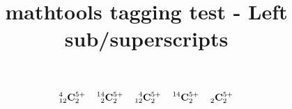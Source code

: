 \documentclass{article}
\title{mathtools tagging test - Left sub/superscripts}
\begin{document}
\[
{}^{4}_{12}\mathbf{C}^{5+}_{2} \quad
\prescript{14}{2}{\mathbf{C}}^{5+}_{2} \quad
\prescript{4}{12}{\mathbf{C}}^{5+}_{2} \quad
\prescript{14}{}{\mathbf{C}}^{5+}_{2} \quad
\prescript{}{2}{\mathbf{C}}^{5+}_{2}
\]
\end{document}
